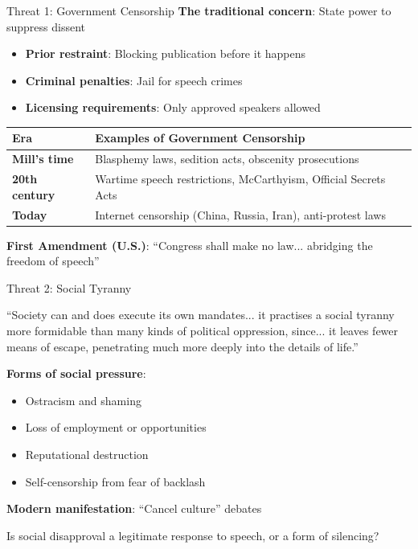 ﻿\documentclass[aspectratio=169,11pt]{beamer}
\begin{document}
\begin{frame}{Threat 1: Government Censorship}
\textbf{The traditional concern}: State power to suppress dissent

\begin{itemize}
    \item \textbf{Prior restraint}: Blocking publication before it happens
    \item \textbf{Criminal penalties}: Jail for speech crimes
    \item \textbf{Licensing requirements}: Only approved speakers allowed
\end{itemize}

\vspace{0.3cm}
\begin{table}[h]
\centering
\small
\begin{tabular}{>{\bfseries}l p{8cm}}
\toprule
Era & Examples of Government Censorship \\
\midrule
Mill's time & Blasphemy laws, sedition acts, obscenity prosecutions \\
20th century & Wartime speech restrictions, McCarthyism, Official Secrets Acts \\
Today & Internet censorship (China, Russia, Iran), anti-protest laws \\
\bottomrule
\end{tabular}
\end{table}

\vspace{0.2cm}
\textbf{First Amendment (U.S.)}: ``Congress shall make no law... abridging the freedom of speech''
\end{frame}

\begin{frame}{Threat 2: Social Tyranny}
\begin{quotebox}
``Society can and does execute its own mandates... it practises a social tyranny more formidable than many kinds of political oppression, since... it leaves fewer means of escape, penetrating much more deeply into the details of life.''
\end{quotebox}

\vspace{0.2cm}
\textbf{Forms of social pressure}:
\begin{itemize}
    \item Ostracism and shaming
    \item Loss of employment or opportunities
    \item Reputational destruction
    \item Self-censorship from fear of backlash
\end{itemize}

\vspace{0.2cm}
\textbf{Modern manifestation}: ``Cancel culture'' debates

\begin{discussionbox}[Discussion]
Is social disapproval a legitimate response to speech, or a form of silencing?
\end{discussionbox}
\end{frame}
\end{document}
